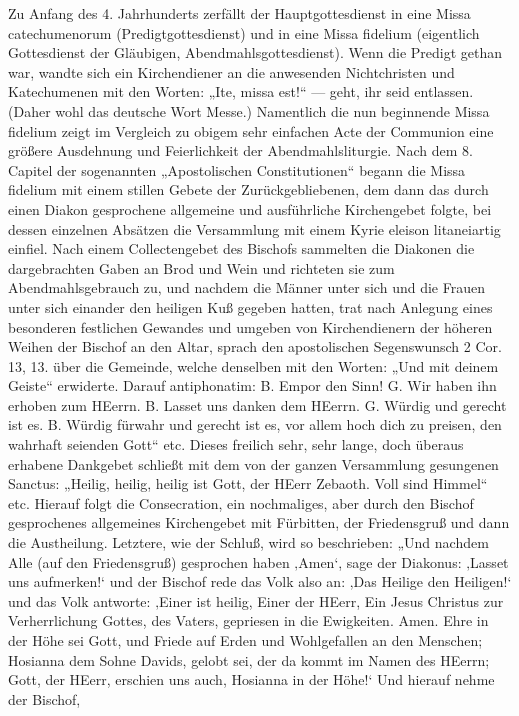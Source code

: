 Zu Anfang des 4. Jahrhunderts zerfällt der Hauptgottesdienst in eine Missa catechumenorum (Predigtgottesdienst) und in eine Missa fidelium (eigentlich Gottesdienst der Gläubigen, Abendmahlsgottesdienst). Wenn die Predigt gethan war, wandte sich ein Kirchendiener an die anwesenden Nichtchristen und Katechumenen mit den Worten: „Ite, missa est!“ — geht, ihr seid entlassen. (Daher wohl das deutsche Wort Messe.) Namentlich die nun beginnende Missa fidelium zeigt im Vergleich zu obigem sehr einfachen Acte der Communion eine größere Ausdehnung und Feierlichkeit der Abendmahlsliturgie. Nach dem 8. Capitel der sogenannten „Apostolischen Constitutionen“ begann die Missa fidelium mit einem stillen Gebete der Zurückgebliebenen, dem dann das durch einen Diakon gesprochene allgemeine und ausführliche Kirchengebet folgte, bei dessen einzelnen Absätzen die Versammlung mit einem Kyrie eleison litaneiartig einfiel. Nach einem Collectengebet des Bischofs sammelten die Diakonen die dargebrachten Gaben an Brod und Wein und richteten sie zum Abendmahlsgebrauch zu, und nachdem die Männer unter sich und die Frauen unter sich einander den heiligen Kuß gegeben hatten, trat nach Anlegung eines besonderen festlichen Gewandes und umgeben von Kirchendienern der höheren Weihen der Bischof an den Altar, sprach den apostolischen Segenswunsch 2 Cor. 13, 13. über die Gemeinde, welche denselben mit den Worten: „Und mit deinem Geiste“ erwiderte. Darauf antiphonatim: B. Empor den Sinn! G. Wir haben ihn erhoben zum HEerrn. B. Lasset uns danken dem HEerrn. G. Würdig und gerecht ist es. B. Würdig fürwahr und gerecht ist es, vor allem hoch dich zu preisen, den wahrhaft seienden Gott“ etc. Dieses freilich sehr, sehr lange, doch überaus erhabene Dankgebet schließt mit dem von der ganzen Versammlung gesungenen Sanctus: „Heilig, heilig, heilig ist Gott, der HEerr Zebaoth. Voll sind Himmel“ etc. Hierauf folgt die Consecration, ein nochmaliges, aber durch den Bischof gesprochenes allgemeines Kirchengebet mit Fürbitten, der Friedensgruß und dann die Austheilung. Letztere, wie der Schluß, wird so beschrieben: „Und nachdem Alle (auf den Friedensgruß) gesprochen haben ‚Amen‘, sage der Diakonus: ‚Lasset uns aufmerken!‘ und der Bischof rede das Volk also an: ‚Das Heilige den Heiligen!‘ und das Volk antworte: ‚Einer ist heilig, Einer der HEerr, Ein Jesus Christus zur Verherrlichung Gottes, des Vaters, gepriesen in die Ewigkeiten. Amen. Ehre in der Höhe sei Gott, und Friede auf Erden und Wohlgefallen an den Menschen; Hosianna dem Sohne Davids, gelobt sei, der da kommt im Namen des HEerrn; Gott, der HEerr, erschien uns auch, Hosianna in der Höhe!‘ Und hierauf nehme der Bischof,
